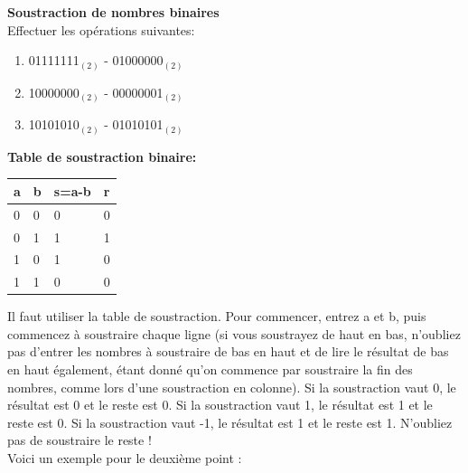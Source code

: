 \begin{Exercice}[15 minutes] \textbf{Soustraction de nombres binaires}\\
    Effectuer les opérations suivantes:

    \begin{enumerate}
        \item 01111111$_{(2)}$ - 01000000$_{(2)}$
        \item 10000000$_{(2)}$ - 00000001$_{(2)}$
        \item 10101010$_{(2)}$ - 01010101$_{(2)}$
    \end{enumerate}

    \begin{conseil}
        \textbf{Table de soustraction binaire:}\\
        \begin{tabular}{| C{0.1\textwidth} | C{0.1\textwidth} | C{0.1\textwidth} | C{0.1\textwidth} |} 
            \hline
            \textbf{a} & \textbf{b} & \textbf{s=a-b} & \textbf{r}\\ [0.5ex]
             & 0 & 0 & 0 \\ [0.5ex] 
             & 1 & 1 & 1 \\ [0.5ex] 
             & 0 & 1 & 0 \\ [0.5ex] 
             & 1 & 0 & 0 \\ [0.5ex] 
            \hline
        \end{tabular}
    \end{conseil}
    
    \begin{solution}
        Il faut utiliser la table de soustraction. Pour commencer, entrez a et b, puis commencez à soustraire chaque ligne (si vous soustrayez de haut en bas, n'oubliez pas d'entrer les nombres à soustraire de bas en haut et de lire le résultat de bas en haut également, étant donné qu'on commence par soustraire la fin des nombres, comme lors d'une soustraction en colonne). Si la soustraction vaut 0, le résultat est 0 et le reste est 0. Si la soustraction vaut 1, le résultat est 1 et le reste est 0. Si la soustraction vaut -1, le résultat est 1 et le reste est 1. N'oubliez pas de soustraire le reste ! \\

Voici un exemple pour le deuxième point : \\
 

\end{solution}
\end{Exercice}
